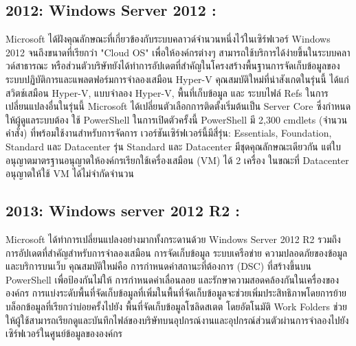 \hspace{0cm}\subsection{2012: Windows Server 2012 :}Microsoft ได้ฝังคุณลักษณะที่เกี่ยวข้องกับระบบคลาวด์จำนวนหนึ่งไว้ในเซิร์ฟเวอร์ Windows 2012 จนถึงขนาดที่เรียกว่า "Cloud OS" เพื่อให้องค์กรต่างๆ สามารถใช้บริการได้ง่ายขึ้นในระบบคลาวด์สาธารณะ  หรือส่วนตัวบริษัทยังได้ทำการอัปเดตที่สำคัญในโครงสร้างพื้นฐานการจัดเก็บข้อมูลของระบบปฏิบัติการและแพลตฟอร์มการจำลองเสมือน Hyper-V  คุณสมบัติใหม่ที่น่าสังเกตในรุ่นนี้ ได้แก่ สวิตช์เสมือน Hyper-V, แบบจำลอง Hyper-V, พื้นที่เก็บข้อมูล และ ระบบไฟล์ Refs ในการเปลี่ยนแปลงอื่นในรุ่นนี้ Microsoft ได้เปลี่ยนตัวเลือกการติดตั้งเริ่มต้นเป็น Server Core ซึ่งกำหนดให้ผู้ดูแลระบบต้อง  ใช้ PowerShell ในการเปิดตัวครั้งนี้ PowerShell มี 2,300 cmdlets (จำนวนคำสั่ง) ที่พร้อมใช้งานสำหรับการจัดการ เวอร์ชันเซิร์ฟเวอร์นี้มีสี่รุ่น: Essentials, Foundation, Standard และ Datacenter รุ่น Standard และ Datacenter มีชุดคุณลักษณะเดียวกัน แต่ใบอนุญาตมาตรฐานอนุญาตให้องค์กรเรียกใช้เครื่องเสมือน (VM) ได้ 2 เครื่อง ในขณะที่ Datacenter อนุญาตให้ใช้ VM ได้ไม่จำกัดจำนวน  

\hspace{0cm}\subsection{2013: Windows server 2012 R2 :}Microsoft ได้ทำการเปลี่ยนแปลงอย่างมากทั้งกระดานด้วย Windows Server 2012 R2 รวมถึงการอัปเดตที่สำคัญสำหรับการจำลองเสมือน การจัดเก็บข้อมูล ระบบเครือข่าย ความปลอดภัยของข้อมูลและบริการบนเว็บ คุณสมบัติใหม่คือ การกำหนดค่าสถานะที่ต้องการ (DSC) ที่สร้างขึ้นบน PowerShell เพื่อป้องกันไม่ให้  การกำหนดค่าเลื่อนลอย  และรักษาความสอดคล้องกันในเครื่องขององค์กร การแบ่งระดับพื้นที่จัดเก็บข้อมูลที่เพิ่มในพื้นที่จัดเก็บข้อมูลจะช่วยเพิ่มประสิทธิภาพโดยการย้ายบล็อกข้อมูลที่เรียกว่าบ่อยครั้งไปยัง  พื้นที่จัดเก็บข้อมูลโซลิดสเตต โดยอัตโนมัติ  Work Folders ช่วยให้ผู้ใช้สามารถเรียกดูและบันทึกไฟล์ของบริษัทบนอุปกรณ์งานและอุปกรณ์ส่วนตัวผ่านการจำลองไปยังเซิร์ฟเวอร์ในศูนย์ข้อมูลขององค์กร  

\clearpage

